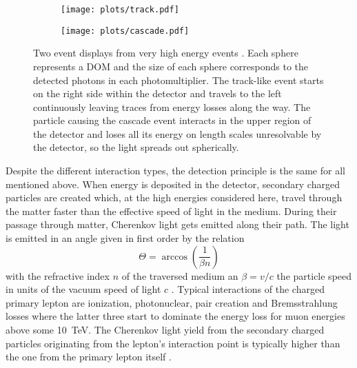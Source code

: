 \begin{figure}[htbp]
  \centering
  \begin{subfigure}[c]{0.49\textwidth}
    \centering
    \texttt{[image: plots/track.pdf]}
  \end{subfigure}
  \hfill
  \begin{subfigure}[c]{0.49\textwidth}
    \centering
    \texttt{[image: plots/cascade.pdf]}
  \end{subfigure}
  \caption{
    Two event displays from very high energy events .
    Each sphere represents a DOM and the size of each sphere corresponds to the detected photons in each photomultiplier.
    The track-like event starts on the right side within the detector and travels to the left continuously leaving traces from energy losses along the way.
    The particle causing the cascade event interacts in the upper region of the detector and loses all its energy on length scales unresolvable by the detector, so the light spreads out spherically.
  }
  \label{fig:icecube_events_topologies}
\end{figure}

Despite the different interaction types, the detection principle is the same for all mentioned above.
When energy is deposited in the detector, secondary charged particles are created which, at the high energies considered here, travel through the matter faster than the effective speed of light in the medium.
During their passage through matter, Cherenkov light gets emitted along their path.
The light is emitted in an angle given in first order by the relation
\begin{equation}
  \Theta = \arccos\left(\frac{1}{\beta n}\right)
\end{equation}
with the refractive index $n$ of the traversed medium an $\beta = v/c$ the particle speed in units of the vacuum speed of light $c$ .
Typical interactions of the charged primary lepton are ionization, photonuclear, pair creation and Bremsstrahlung losses where the latter three start to dominate the energy loss for muon energies above some \SI{10}{\tera\eV}.
The Cherenkov light yield from the secondary charged particles originating from the lepton's interaction point is typically higher than the one from the primary lepton itself .

